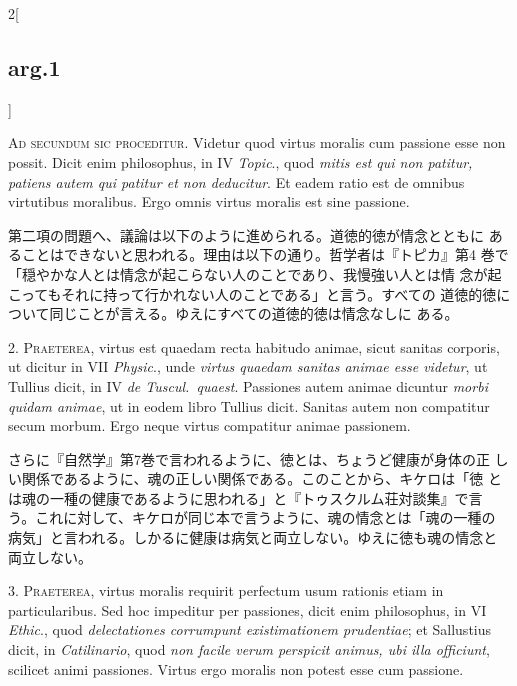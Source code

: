 \documentclass[paper=a4paper,fontsize=10pt,jafontsize=9pt,titlepage]{jlreq}
\begin{document}
\begin{paracol}{2}[\subsection{arg.1}]

{\scshape Ad secundum sic proceditur}. Videtur quod virtus moralis cum
passione esse non possit. Dicit enim philosophus, in IV {\itshape
Topic}., quod {\itshape mitis est qui non patitur, patiens autem qui
patitur et non deducitur}. Et eadem ratio est de omnibus virtutibus
moralibus. Ergo omnis virtus moralis est sine passione.

\switchcolumn

第二項の問題へ、議論は以下のように進められる。道徳的徳が情念とともに
 あることはできないと思われる。理由は以下の通り。哲学者は『トピカ』第4
 巻で「穏やかな人とは情念が起こらない人のことであり、我慢強い人とは情
 念が起こってもそれに持って行かれない人のことである」と言う。すべての
 道徳的徳について同じことが言える。ゆえにすべての道徳的徳は情念なしに
 ある。


2. {\scshape Praeterea}, virtus est quaedam recta habitudo animae,
sicut sanitas corporis, ut dicitur in VII {\itshape Physic}., unde
{\itshape virtus quaedam sanitas animae esse videtur}, ut Tullius
dicit, in IV {\itshape de Tuscul.~quaest}. Passiones autem animae
dicuntur {\itshape morbi quidam animae}, ut in eodem libro Tullius
dicit. Sanitas autem non compatitur secum morbum. Ergo neque virtus
compatitur animae passionem.

\switchcolumn

さらに『自然学』第7巻で言われるように、徳とは、ちょうど健康が身体の正
しい関係であるように、魂の正しい関係である。このことから、キケロは「徳
とは魂の一種の健康であるように思われる」と『トゥスクルム荘対談集』で言
う。これに対して、キケロが同じ本で言うように、魂の情念とは「魂の一種の
病気」と言われる。しかるに健康は病気と両立しない。ゆえに徳も魂の情念と
両立しない。


3. {\scshape Praeterea}, virtus moralis requirit perfectum usum
rationis etiam in particularibus. Sed hoc impeditur per passiones,
dicit enim philosophus, in VI {\itshape Ethic}., quod {\itshape
delectationes corrumpunt existimationem prudentiae}; et Sallustius
dicit, in {\itshape Catilinario}, quod {\itshape non facile verum
perspicit animus, ubi illa officiunt}, scilicet animi
passiones. Virtus ergo moralis non potest esse cum passione.


\end{paracol}
\end{document}
